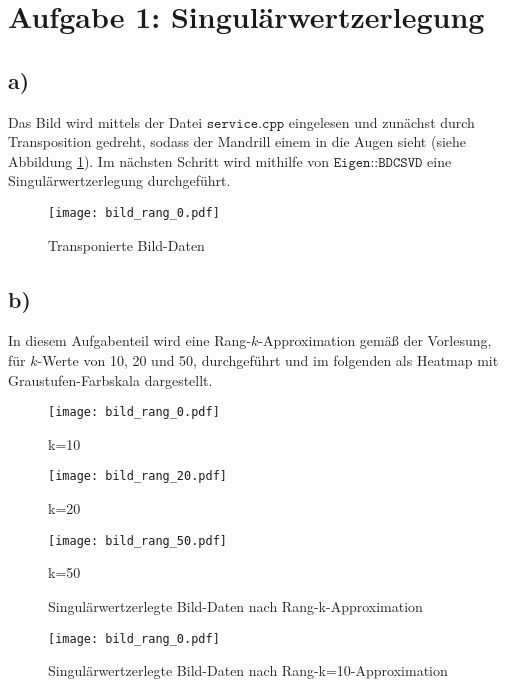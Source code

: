 



\maketitle

\section*{Aufgabe 1: Singulärwertzerlegung}
\subsection*{a)}
Das Bild wird mittels der Datei $\texttt{service.cpp}$ eingelesen und
zunächst durch Transposition gedreht, sodass der Mandrill einem in die Augen
sieht (siehe Abbildung \ref{fig:1a}). Im nächsten Schritt wird mithilfe von
$\texttt{Eigen::BDCSVD}$ eine Singulärwertzerlegung durchgeführt.

\begin{figure}[h]
    \centering
    \texttt{[image: bild\_rang\_0.pdf]}
    \caption{Transponierte Bild-Daten}
    \label{fig:1a}
\end{figure}

\subsection*{b)}
In diesem Aufgabenteil wird eine Rang-$k$-Approximation gemäß der Vorlesung,
für $k$-Werte von  10, 20 und 50, durchgeführt und im folgenden als Heatmap mit
Graustufen-Farbskala dargestellt.

\begin{figure}[!htb]
\texttt{[image: bild\_rang\_0.pdf]}
\caption*{k=10}
\label{fig:1b_10}
\endminipage\hfill
{}
\texttt{[image: bild\_rang\_20.pdf]}
\caption*{k=20}
\label{fig:1b_20}
\endminipage\hfill
{}%
\texttt{[image: bild\_rang\_50.pdf]}
\caption*{k=50}
\label{fig:1b_50}
\endminipage
\caption{Singulärwertzerlegte Bild-Daten nach Rang-k-Approximation}
\end{figure}

\begin{figure}[h]
    \centering
    \texttt{[image: bild\_rang\_0.pdf]}
    \caption{Singulärwertzerlegte Bild-Daten nach Rang-k=10-Approximation}
    \label{fig:1b_10}
\end{figure}

